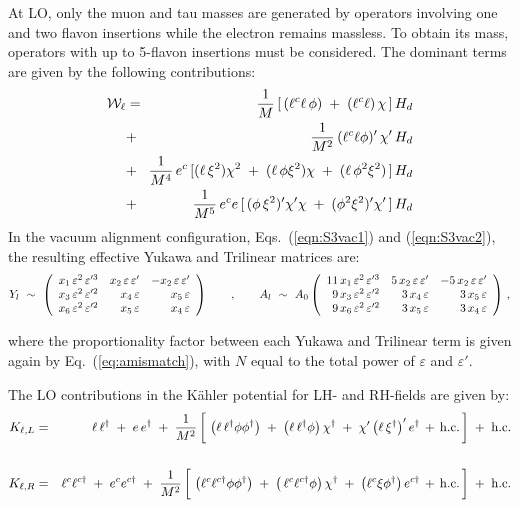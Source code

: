 \documentclass[a4paper,11pt]{article}
\newcommand{\bea}{\begin{eqnarray}}
\newcommand{\beq}{\begin{equation}}
\newcommand{\eea}{\end{eqnarray}}
\newcommand{\eeq}{\end{equation}}
\newcommand{\vep}{\varepsilon}
\newcommand{\nn}{\nonumber}
\newcommand{\eq}[1]{Eq.~(\ref{#1})}
\begin{document}
At LO, only the muon and tau masses are generated by operators involving one and two flavon insertions while the electron remains massless. To obtain its mass, operators with up to 5-flavon insertions must be considered. The dominant terms are given by the following contributions:
\bea \label{eqn:S3Weff}
  {\cal W}_\ell & = & \frac{1}{M}\, [\, (\ell^{c} \ell\,\phi)\;+\; (\ell^{c} \ell)\,\chi \,] \,H_{d} \nn\\
  			 & + & \hspace{-0.1cm} \frac{1}{M^{2}}\,(\ell^{c} \ell \phi)'\, \chi'\, H_{d} \nn \\
  			 & + & \hspace{-0.15cm} \frac{1}{M^4}\,e^c\,[(\ell\,\xi^2)\chi^2 \;+\; (\ell\,\phi\xi^2)\chi \;+\; (\ell\, \phi^2\xi^2) \,]\, H_d \nn \\
  			 & + & \hspace{-0.15cm} \frac{1}{M^5}\, e^ce\, [\,(\phi\,\xi^2)'\chi'\chi \;+\; (\phi^2\xi^2)'\chi'\,]\, H_d
\eea
In the vacuum alignment configuration, Eqs.~(\ref{eqn:S3vac1}) and (\ref{eqn:S3vac2}), the resulting effective Yukawa and Trilinear matrices are:
\beq
  Y_l ~ \sim ~ \left(\begin{array}{rrr}
             x_1\,\vep^{2}\,\vep'^{3} & x_2\,\vep\,\vep' & -x_2\,\vep\,\vep' \\
             x_3\,\vep^{2}\,\vep'^{2} & x_4\,\vep        &  x_5\,\vep \\
             x_6\,\vep^{2}\,\vep'^{2} & x_5\,\vep        &   x_4\,\vep   
             \end{array} \right)
  \hspace{0.7cm},\hspace{0.7cm}
  A_l ~ \sim ~ A_{0} \left(\begin{array}{rrr}
             11\,x_{1}\,\vep^{2}\,\vep'^{3} & 5\,x_2\,\vep\,\vep' & -5\,x_2\,\vep\,\vep' \\
              9\,x_3\,\vep^{2}\,\vep'^{2} &  3\,x_4\,\vep &    3\,x_5\,\vep  \\
              9\,x_6\,\vep^{2}\,\vep'^{2} &    3\,x_5\,\vep &   3\,x_4\,\vep    
             \end{array} \right)\, ,
\eeq

where the proportionality factor between each Yukawa and Trilinear term is given again by \eq{eq:amismatch}, with $N$ equal to the total power of $\vep$ and $\vep'$.

The LO contributions in the K\"ahler potential for LH- and RH-fields are given by:
\bea
  K_{\ell,L} & = & \ell\,{\ell}^\dagger \;+\; e\,e^\dagger \;+\; \frac{1}{M^2}\, \bigg[\, \left(\ell\,\ell^\dagger \phi \phi^\dagger\right) \;+\; \left(\ell\,\ell^\dagger \phi \right)\chi^\dagger \;+\; \chi'\left(\ell\,\xi^\dagger \right)'e^\dagger \,+\, {\rm h.c.} \,\bigg] \;+\; {\rm h.c.} \\
  \nn \\
  K_{\ell,R} & = & \ell^c \ell^{c\dagger} \;+\; e^c e^{c\dagger} \;+\; \frac{1}{M^2}\, \bigg[\, \left(\ell^c\ell^{c\dagger}\phi\phi^\dagger\right)  \;+\; \left(\, \ell^c\ell^{c\dagger}\phi\right)\chi^\dagger  \;+\; \left(\ell^c\xi\phi^\dagger\right)e^{c\dagger} \,+\, {\rm h.c.} \,\bigg] \;+\; {\rm h.c.} \nn\\
\eea
\end{document}
